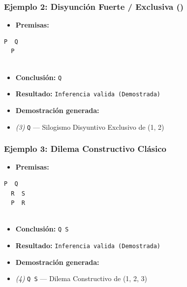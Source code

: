 \documentclass[11pt,a4paper,openany]{book}
\begin{document}
\subsubsection{Ejemplo 2: Disyunción Fuerte / Exclusiva (\texttt{})}
\begin{itemize}[leftmargin=*]
\item \textbf{Premisas:}
\end{itemize}
\begin{lstlisting}[language={},basicstyle=\ttfamily\scriptsize]
  P  Q
  P
  
\end{lstlisting}
\begin{itemize}[leftmargin=*]
\item \textbf{Conclusión:} \texttt{Q}
\item \textbf{Resultado:} \texttt{Inferencia valida (Demostrada)}
\item \textbf{Demostración generada:}
\item \textit{(3)} \texttt{Q} --- Silogismo Disyuntivo Exclusivo de (1, 2)
\end{itemize}

\subsubsection{Ejemplo 3: Dilema Constructivo Clásico}
\begin{itemize}[leftmargin=*]
\item \textbf{Premisas:}
\end{itemize}
\begin{lstlisting}[language={},basicstyle=\ttfamily\scriptsize]
  P  Q
  R  S
  P  R
  
\end{lstlisting}
\begin{itemize}[leftmargin=*]
\item \textbf{Conclusión:} \texttt{Q  S}
\item \textbf{Resultado:} \texttt{Inferencia valida (Demostrada)}
\item \textbf{Demostración generada:}
\item \textit{(4)} \texttt{Q  S} --- Dilema Constructivo de (1, 2, 3)
\end{itemize}
\end{document}
